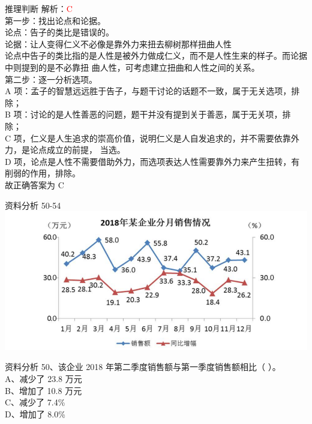 \documentclass[aspectratio=169]{beamer}
\begin{document}
\begin{frame}[t]{推理判断}
    解析：\textcolor{red}{C}\\
    第一步：找出论点和论据。\\
    论点：告子的类比是错误的。\\
    论据：让人变得仁义不必像是靠外力来扭去柳树那样扭曲人性\\
    论点中告子的类比指的是人性是被外力做成仁义，而不是人性生来的样子。而论据中则提到的是不必靠扭
    曲人性，可考虑建立扭曲和人性之间的关系。\\
    第二步：逐一分析选项。\\
    A 项：孟子的智慧远远胜于告子，与题干讨论的话题不一致，属于无关选项，排除；\\
    B 项：讨论的是人性善恶的问题，题干并没有提到关于善恶，属于无关项，排除；\\
    C 项，仁义是人生追求的崇高价值，说明仁义是人自发追求的，并不需要依靠外力，是论点成立的前提，
    当选。\\
    D 项，论点是人性不需要借助外力，而选项表达人性需要靠外力来产生扭转，有削弱的作用，排除。\\
    故正确答案为 C\\
\end{frame}                           


\begin{frame}[t]{资料分析}
    50-54\\
    \includegraphics[scale=0.5]{50254}\\ 
\end{frame}                           


\begin{frame}[t]{资料分析}
    50、该企业 2018 年第二季度销售额与第一季度销售额相比（ ）。              \\
    A、减少了 23.8 万元                                                      \\
    B、增加了 10.8 万元                                                      \\
    C、减少了 7.4\%                                                          \\ 
    D、增加了 8.0\%                                                          \\
\end{frame}                           
\end{document}
